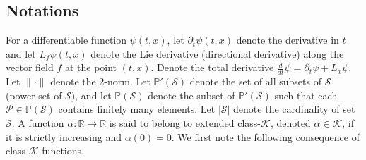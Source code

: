 \documentclass[10pt,conference]{ieeeconf}
\renewcommand{\(}{\left(}
\renewcommand{\)}{\right)}
\renewcommand{\[}{\left[}
\renewcommand{\]}{\right]}
\newcommand{\reals}{\mathbb{R}}
\newtheorem{definition}{Definition}
\begin{document}
\subsection{Notations}

For a differentiable function ${\psi}(t,x)$, let $\partial_t {\psi}(t,x)$ denote the derivative in $t$ %
and let $L_f {\psi}(t,x)$ denote the Lie derivative (directional derivative) along the vector field $f$ at the point $(t,x)$. Denote the total derivative $\frac{d}{dt}{\psi} = \partial_t {\psi} + L_{\dot{x}} {\psi}$. 
%
%
%
Let $\| \cdot \|$ denote the 2-norm. Let $\mathbb{P}'(\mathcal{S})$ denote the set of all subsets of $\mathcal{S}$ {(power set of $\mathcal{S}$)}, and let $\mathbb{P}(\mathcal{S})$ denote the subset of $\mathbb{P}'(\mathcal{S})$ such that each $\mathcal{P}\in\mathbb{P}(\mathcal{S})$ contains finitely many elements. Let $|\mathcal{S}|$ denote the cardinality of set $\mathcal{S}$. A function $\alpha:\reals\rightarrow\reals$ is said to belong to extended class-$\mathcal{K}$, denoted $\alpha \in \mathcal{K}$, if it is strictly increasing and $\alpha(0) = 0$. 
We first note the following consequence of class-$\mathcal{K}$ functions.
\end{document}
